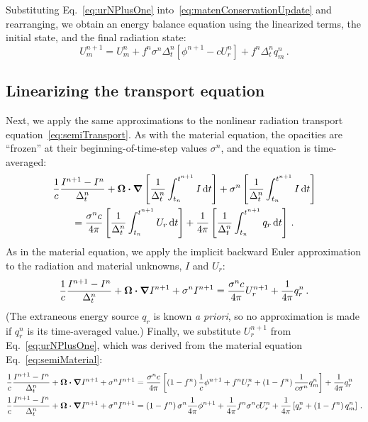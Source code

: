 Substituting Eq.~\eqref{eq:urNPlusOne} into~\eqref{eq:matenConservationUpdate}
and rearranging, we obtain an energy balance equation using the linearized
terms, the initial state, and the final radiation state:
\begin{equation}\label{eq:matenConservationUpdate2}
  U_m^{n+1} = U_m^n + f^n \sigma^n \Delta_t^n
  \left[ \phi^{n+1} - c U_r^n \right] + f^n \Delta_t^n q_m^n \,.
\end{equation}

\subsection{Linearizing the transport equation}
Next, we apply the same approximations to the nonlinear radiation
transport equation~\eqref{eq:semiTransport}. As with the material equation,
the
opacities are ``frozen'' at their beginning-of-time-step values $\sigma^n$, and
the equation is time-averaged:
\begin{multline*}
  \frac{1}{c} \frac{I^{n+1} - I^n}{\Delta_t^n}
  + \bm{\Omega} \bm{\cdot} \bm{\nabla} \left[
  \frac{1}{\Delta_t^n}\int_{t_n}^{t^{n+1}} I\mathop{}\!\mathrm{d} t
  \right] +
 \sigma^n \left[
  \frac{1}{\Delta_t^n}\int_{t_n}^{t^{n+1}} I\mathop{}\!\mathrm{d} t
  \right]
  \\
  = \frac{\sigma^n c}{4\pi} \left[
  \frac{1}{\Delta_t^n}\int_{t_n}^{t^{n+1}} U_r \mathop{}\!\mathrm{d} t \right]
  + \frac{1}{4\pi}\left[
  \frac{1}{\Delta_t^n}\int_{t_n}^{t^{n+1}} q_r \mathop{}\!\mathrm{d} t \right] \,.
\end{multline*}
As in the material equation, we apply the implicit backward Euler approximation
to the radiation and
material unknowns, $I$ and $U_r$:
\begin{equation*}
  \frac{1}{c} \frac{I^{n+1} - I^n}{\Delta_t^n}
  + \bm{\Omega} \bm{\cdot} \bm{\nabla} I^{n+1}
 + \sigma^n I^{n+1}
 = \frac{\sigma^n c}{4\pi} U_r^{n+1}
  + \frac{1}{4\pi} q_r^n \,.
\end{equation*}
(The extraneous energy source $q_r$ is known \emph{a priori}, so no
approximation is made if $q_r^n$ is its time-averaged value.)
Finally, we substitute $U_r^{n+1}$ from Eq.~\eqref{eq:urNPlusOne},
which was derived from the material equation Eq.~\eqref{eq:semiMaterial}:
\begin{align}\nonumber
  \frac{1}{c} \frac{I^{n+1} - I^n}{\Delta_t^n}
  + \bm{\Omega} \bm{\cdot} \bm{\nabla} I^{n+1}
 + \sigma^n I^{n+1}
 &= \frac{\sigma^n c}{4\pi} \left[ \left(1 - f^n\right) \frac1c \phi^{n+1}
   + f^n U_r^n
   + \left(1 - f^n\right)\frac{1}{c \sigma^n} q_m^n \right]
  + \frac{1}{4\pi} q_r^n
  \\ \label{eq:linearizedGrayTransport}
  \frac{1}{c} \frac{I^{n+1} - I^n}{\Delta_t^n}
  + \bm{\Omega} \bm{\cdot} \bm{\nabla} I^{n+1}
 + \sigma^n I^{n+1}
 &=  \left(1 - f^n\right) \sigma^n \frac{1}{4\pi} \phi^{n+1}
 + \frac{1}{4\pi} f^n \sigma^n c U_r^n
 + \frac{1}{4\pi} \left[ q_r^n + \left(1 - f^n\right) q_m^n \right] \,.
\end{align}

